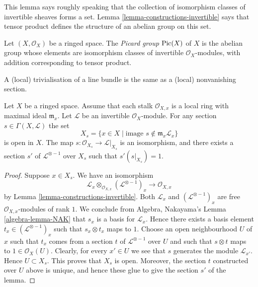 \noindent
This lemma says roughly speaking that the collection of
isomorphism classes of invertible sheaves forms a set.
Lemma \ref{lemma-constructions-invertible} says that
tensor product defines the structure of an abelian group
on this set.

\begin{definition}
\label{definition-pic}
Let $(X, \mathcal{O}_X)$ be a ringed space.
The {\it Picard group} $\mathop{\mathrm{Pic}}\nolimits(X)$ of $X$ is the
abelian group whose elements are isomorphism classes of
invertible $\mathcal{O}_X$-modules, with addition
corresponding to tensor product.
\end{definition}

\begin{lemma}
\label{lemma-s-open}
\begin{slogan}
A (local) trivialisation of a line bundle
is the same as a (local) nonvanishing section.
\end{slogan}
Let $X$ be a ringed space. Assume that each stalk $\mathcal{O}_{X, x}$
is a local ring with maximal ideal $\mathfrak m_x$.
Let $\mathcal{L}$ be an invertible $\mathcal{O}_X$-module.
For any section $s \in \Gamma(X, \mathcal{L})$ the set
$$
X_s = \{x \in X \mid \text{image }s \not\in \mathfrak m_x\mathcal{L}_x\}
$$
is open in $X$. The map $s : \mathcal{O}_{X_s} \to \mathcal{L}|_{X_s}$
is an isomorphism, and there exists a section $s'$
of $\mathcal{L}^{\otimes -1}$ over $X_s$ such that $s' (s|_{X_s}) = 1$.
\end{lemma}

\begin{proof}
Suppose $x \in X_s$.
We have an isomorphism
$$
\mathcal{L}_x \otimes_{\mathcal{O}_{X, x}} (\mathcal{L}^{\otimes -1})_x
\longrightarrow
\mathcal{O}_{X, x}
$$
by Lemma \ref{lemma-constructions-invertible}.
Both $\mathcal{L}_x$ and $(\mathcal{L}^{\otimes -1})_x$
are free $\mathcal{O}_{X, x}$-modules of rank $1$. We conclude
from Algebra, Nakayama's Lemma \ref{algebra-lemma-NAK} that
$s_x$ is a basis for $\mathcal{L}_x$. Hence there exists
a basis element $t_x \in (\mathcal{L}^{\otimes -1})_x$
such that $s_x \otimes t_x$ maps to $1$.
Choose an open neighbourhood $U$ of
$x$ such that $t_x$ comes from a section $t$
of $\mathcal{L}^{\otimes -1}$ over $U$ and such that
$s \otimes t$ maps to $1 \in \mathcal{O}_X(U)$.
Clearly, for every $x' \in U$ we see that $s$ generates
the module $\mathcal{L}_{x'}$. Hence $U \subset X_s$.
This proves that $X_s$ is open. Moreover, the section
$t$ constructed over $U$ above is unique, and hence
these glue to give the section $s'$ of the lemma.
\end{proof}

